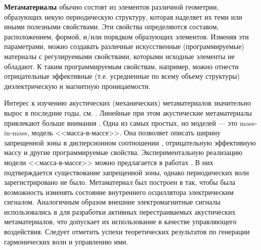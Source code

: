 \textbf{Метаматериалы} обычно состоят из элементов различной геометрии, образующих некую периодическую структуру, которая наделяет их теми или иными полезными свойствами. Эти свойства определяются составом, расположением, формой, и/или порядком образующих элементов. Изменяя эти параметрами, можно создавать различные искусственные (программируемые) материалы с регулируемыми свойствами, которыми исходные элементы не обладают. К таким программируемым свойствам, например, можно отнести отрицательные эффективные (т.е. усредненные по всему объему структуры) диэлектрическую и магнитную проницаемости.

Интерес к изучению акустических (механических) метаматериалов значительно вырос в последние годы, см. \cite{Cummer, Cvet, Huang2010, Ma, muller, delis1, Eremeyev2020, Porubov2019, Erofeev2020}. Линейные при этом акустические метаматериалы привлекают больше внимания \cite{Cvet, Huang2010, muller}. Одна из самых простых, но  моделей --- это mass-in-mass, модель <<масса-в-массе>>. Она позволяет описать ширину запрещенной зоны в дисперсионном соотношении \cite{Cvet, Huang2010}, отрицательную эффективную массу и другие программируемые свойства. 
Экспериментальную реализацию модели <<масса-в-массе>> можно предлагается в работах \cite{Cvet, Yang, Yao2008, Zhou2015}. В них подтверждается существование запрещенной зоны, однако периодических волн зарегистрировано не было. Метаматериал был построен в \cite{Yang} так, чтобы была возможность изменять состояние внутреннего осциллятора электрическим сигналом. Аналогичным образом внешние электромагнитные сигналы использовались в \cite{Chen2014, Xiao2015} для разработки активных перестраиваемых акустических метаматериалов, что допускает их использование в качестве управляющего воздействия. Следует отметить успехи теоретических результатов по генерации гармонических волн и управлению ими.

